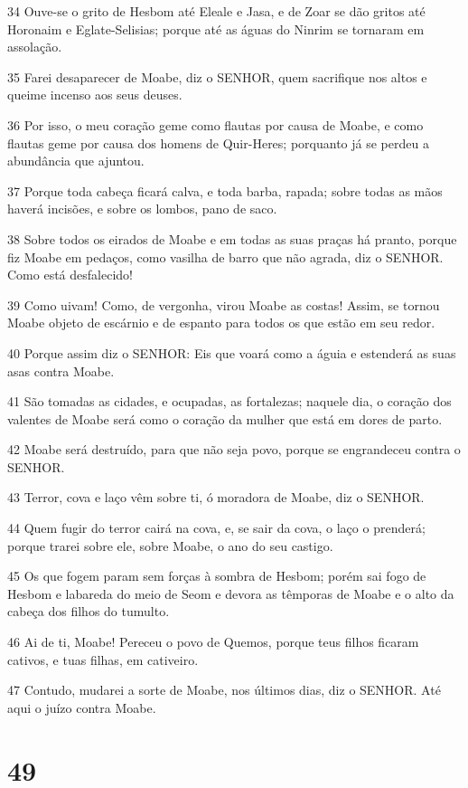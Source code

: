 \par 34 Ouve-se o grito de Hesbom até Eleale e Jasa, e de Zoar se dão gritos até Horonaim e Eglate-Selisias; porque até as águas do Ninrim se tornaram em assolação.
\par 35 Farei desaparecer de Moabe, diz o SENHOR, quem sacrifique nos altos e queime incenso aos seus deuses.
\par 36 Por isso, o meu coração geme como flautas por causa de Moabe, e como flautas geme por causa dos homens de Quir-Heres; porquanto já se perdeu a abundância que ajuntou.
\par 37 Porque toda cabeça ficará calva, e toda barba, rapada; sobre todas as mãos haverá incisões, e sobre os lombos, pano de saco.
\par 38 Sobre todos os eirados de Moabe e em todas as suas praças há pranto, porque fiz Moabe em pedaços, como vasilha de barro que não agrada, diz o SENHOR. Como está desfalecido!
\par 39 Como uivam! Como, de vergonha, virou Moabe as costas! Assim, se tornou Moabe objeto de escárnio e de espanto para todos os que estão em seu redor.
\par 40 Porque assim diz o SENHOR: Eis que voará como a águia e estenderá as suas asas contra Moabe.
\par 41 São tomadas as cidades, e ocupadas, as fortalezas; naquele dia, o coração dos valentes de Moabe será como o coração da mulher que está em dores de parto.
\par 42 Moabe será destruído, para que não seja povo, porque se engrandeceu contra o SENHOR.
\par 43 Terror, cova e laço vêm sobre ti, ó moradora de Moabe, diz o SENHOR.
\par 44 Quem fugir do terror cairá na cova, e, se sair da cova, o laço o prenderá; porque trarei sobre ele, sobre Moabe, o ano do seu castigo.
\par 45 Os que fogem param sem forças à sombra de Hesbom; porém sai fogo de Hesbom e labareda do meio de Seom e devora as têmporas de Moabe e o alto da cabeça dos filhos do tumulto.
\par 46 Ai de ti, Moabe! Pereceu o povo de Quemos, porque teus filhos ficaram cativos, e tuas filhas, em cativeiro.
\par 47 Contudo, mudarei a sorte de Moabe, nos últimos dias, diz o SENHOR. Até aqui o juízo contra Moabe.

\chapter{49}

